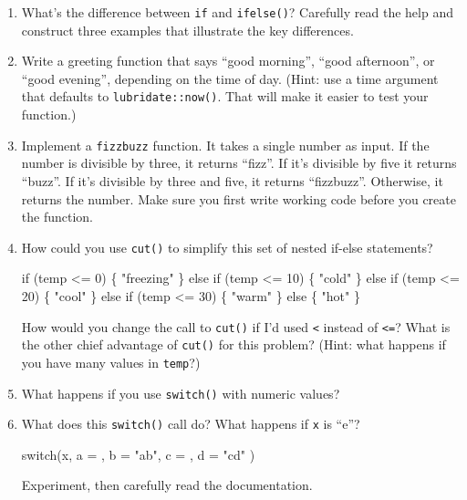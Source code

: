 \documentclass[]{book}
\newenvironment{Shaded}{\begin{snugshade}}{\end{snugshade}}
\newcommand{\DataTypeTok}[1]{\textcolor[rgb]{0.13,0.29,0.53}{{#1}}}
\newcommand{\DecValTok}[1]{\textcolor[rgb]{0.00,0.00,0.81}{{#1}}}
\newcommand{\StringTok}[1]{\textcolor[rgb]{0.31,0.60,0.02}{{#1}}}
\newcommand{\NormalTok}[1]{{#1}}
\begin{document}
\begin{enumerate}
\def\labelenumi{\arabic{enumi}.}
\item
  What's the difference between \texttt{if} and \texttt{ifelse()}?
  Carefully read the help and construct three examples that illustrate
  the key differences.
\item
  Write a greeting function that says ``good morning'', ``good
  afternoon'', or ``good evening'', depending on the time of day. (Hint:
  use a time argument that defaults to \texttt{lubridate::now()}. That
  will make it easier to test your function.)
\item
  Implement a \texttt{fizzbuzz} function. It takes a single number as
  input. If the number is divisible by three, it returns ``fizz''. If
  it's divisible by five it returns ``buzz''. If it's divisible by three
  and five, it returns ``fizzbuzz''. Otherwise, it returns the number.
  Make sure you first write working code before you create the function.
\item
  How could you use \texttt{cut()} to simplify this set of nested
  if-else statements?

\begin{Shaded}
\begin{Highlighting}[]
\NormalTok{if (temp <=}\StringTok{ }\DecValTok{0}\NormalTok{) \{}
  \StringTok{"freezing"}
\NormalTok{\} else if (temp <=}\StringTok{ }\DecValTok{10}\NormalTok{) \{}
  \StringTok{"cold"}
\NormalTok{\} else if (temp <=}\StringTok{ }\DecValTok{20}\NormalTok{) \{}
  \StringTok{"cool"}
\NormalTok{\} else if (temp <=}\StringTok{ }\DecValTok{30}\NormalTok{) \{}
  \StringTok{"warm"}
\NormalTok{\} else \{}
  \StringTok{"hot"}
\NormalTok{\}}
\end{Highlighting}
\end{Shaded}

  How would you change the call to \texttt{cut()} if I'd used
  \texttt{\textless{}} instead of \texttt{\textless{}=}? What is the
  other chief advantage of \texttt{cut()} for this problem? (Hint: what
  happens if you have many values in \texttt{temp}?)
\item
  What happens if you use \texttt{switch()} with numeric values?
\item
  What does this \texttt{switch()} call do? What happens if \texttt{x}
  is ``e''?

\begin{Shaded}
\begin{Highlighting}[]
\NormalTok{switch(x, }
  \DataTypeTok{a =} \NormalTok{,}
  \DataTypeTok{b =} \StringTok{"ab"}\NormalTok{,}
  \DataTypeTok{c =} \NormalTok{,}
  \DataTypeTok{d =} \StringTok{"cd"}
\NormalTok{)}
\end{Highlighting}
\end{Shaded}

  Experiment, then carefully read the documentation.
\end{enumerate}
\end{document}
